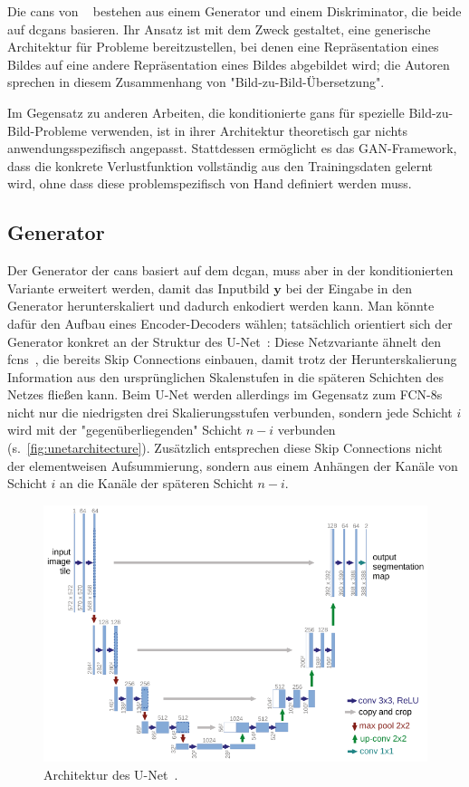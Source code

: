 Die \glspl{can} von \citeauthor{Isola.2017}~\cite{Isola.2017} bestehen aus einem Generator und einem Diskriminator, die beide auf \glspl{dcgan} basieren.
Ihr Ansatz ist mit dem Zweck gestaltet, eine generische Architektur für Probleme bereitzustellen, bei denen eine Repräsentation eines Bildes auf eine andere Repräsentation eines Bildes abgebildet wird; die Autoren sprechen in diesem Zusammenhang von "Bild-zu-Bild-Übersetzung".

Im Gegensatz zu anderen Arbeiten, die konditionierte \glspl{gan} für spezielle Bild-zu-Bild-Probleme verwenden, ist in ihrer Architektur theoretisch gar nichts anwendungsspezifisch angepasst.
Stattdessen ermöglicht es das GAN-Framework, dass die konkrete Verlustfunktion vollständig aus den Trainingsdaten gelernt wird, ohne dass diese problemspezifisch von Hand definiert werden muss.



\subsection{Generator}

Der Generator der \glspl{can} basiert auf dem \gls{dcgan}, muss aber in der konditionierten Variante erweitert werden, damit das Inputbild $ \mathbf{y} $ bei der Eingabe in den Generator herunterskaliert und dadurch enkodiert werden kann.
Man könnte dafür den Aufbau eines Encoder-Decoders wählen; tatsächlich orientiert sich der Generator konkret an der Struktur des U-Net~\cite{Ronneberger.2015}:
Diese Netzvariante ähnelt den \glspl{fcn}~\cite{Long.2015}, die bereits Skip Connections einbauen, damit trotz der Herunterskalierung Information aus den ursprünglichen Skalenstufen in die späteren Schichten des Netzes fließen kann.
Beim U-Net werden allerdings im Gegensatz zum FCN-8s nicht nur die niedrigsten drei Skalierungsstufen verbunden, sondern jede Schicht $ i $ wird mit der "gegenüberliegenden" Schicht $ n-i $ verbunden (s.~\autoref{fig:unetarchitecture}).
Zusätzlich entsprechen diese Skip Connections nicht der elementweisen Aufsummierung, sondern aus einem Anhängen der Kanäle von Schicht $ i $ an die Kanäle der späteren Schicht $ n-i $.

\begin{figure}
	\centering
	\includegraphics[width=0.7\linewidth]{img/unet_architecture}
	\caption{Architektur des U-Net~\cite{Ronneberger.2015}.}
	\label{fig:unetarchitecture}
\end{figure}



